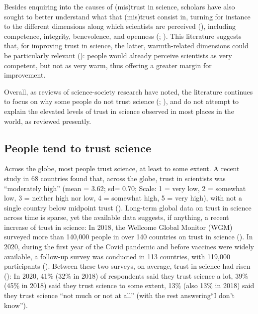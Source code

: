 \documentclass[
  jou,
  floatsintext,
  longtable,
  nolmodern,
  notxfonts,
  notimes,
  colorlinks=true,linkcolor=blue,citecolor=blue,urlcolor=blue]{apa7}
\begin{document}
Besides enquiring into the causes of (mis)trust in science, scholars
have also sought to better understand what that (mis)trust consist in,
turning for instance to the different dimensions along which scientists
are perceived
(),
including competence, integrity, benevolence, and openness
(; ). This literature suggests that, for improving trust in
science, the latter, warmth-related dimensions could be particularly
relevant (): people would already perceive scientists as very competent, but
not as very warm, thus offering a greater margin for improvement.

Overall, as reviews of science-society research have noted, the
literature continues to focus on why some people do not trust science
(;
), and do
not attempt to explain the elevated levels of trust in science observed
in most places in the world, as reviewed presently.

\subsection{People tend to trust
science}\label{people-tend-to-trust-science}

Across the globe, most people trust science, at least to some extent. A
recent study in 68 countries found that, across the globe, trust in
scientists was ``moderately high'' (mean = 3.62; sd= 0.70; Scale: 1 =
very low, 2 = somewhat low, 3 = neither high nor low, 4 = somewhat high,
5 = very high), with not a single country below midpoint trust
().
Long-term global data on trust in science across time is sparse, yet the
available data suggests, if anything, a recent increase of trust in
science: In 2018, the Wellcome Global Monitor (WGM) surveyed more than
140,000 people in over 140 countries on trust in science
(). In 2020, during the first year of the Covid
pandemic and before vaccines were widely available, a follow-up survey
was conducted in 113 countries, with 119,000 participants
(). Between these two surveys, on average, trust in
science had risen
(): In 2020, 41\% (32\% in 2018) of respondents said
they trust science a lot, 39\% (45\% in 2018) said they trust science to
some extent, 13\% (also 13\% in 2018) said they trust science ``not much
or not at all'' (with the rest answering``I don't know'').
\end{document}
